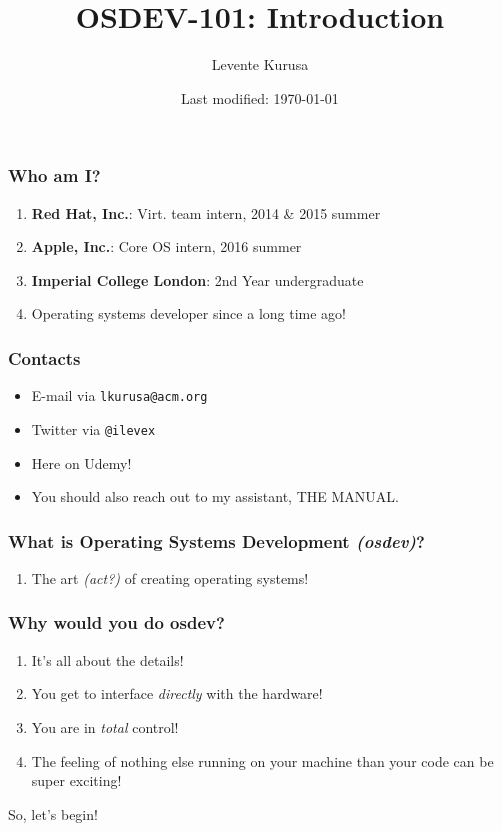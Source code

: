 \documentclass{beamer}
\title{OSDEV-101: Introduction}
\author{Levente Kurusa}
\institute{lkurusa@acm.org}
\date{Last modified: \today}
\begin{document}
\maketitle

\begin{frame}
\frametitle{Who am I?}
\begin{enumerate}
\item \textbf{Red Hat, Inc.}: Virt. team intern, 2014 \& 2015 summer
\item \textbf{Apple, Inc.}: Core OS intern, 2016 summer
\item \textbf{Imperial College London}: 2nd Year undergraduate
\item Operating systems developer since a long time ago!
\end{enumerate}
\end{frame}

\begin{frame}
\frametitle{Contacts}
\begin{itemize}
\item E-mail via \texttt{lkurusa@acm.org}
\item Twitter via \texttt{@ilevex}
\item Here on Udemy!
\item You should also reach out to my assistant, THE MANUAL.
\end{itemize}
\end{frame}

\begin{frame}
\frametitle{What is Operating Systems Development \textit{(osdev)}?}
\begin{enumerate}
\item The art \textit{(act?)} of creating operating systems!
\end{enumerate}
\end{frame}

\begin{frame}
\frametitle{Why would you do osdev?}
\begin{enumerate}
\item It's all about the details!
\item You get to interface \emph{directly} with the hardware!
\item You are in \emph{total} control!
\item The feeling of nothing else running on your machine than your code can be super exciting!
\end{enumerate}
\end{frame}

\begin{frame}
\begin{center}
So, let's begin!
\end{center}
\end{frame}
\end{document}
